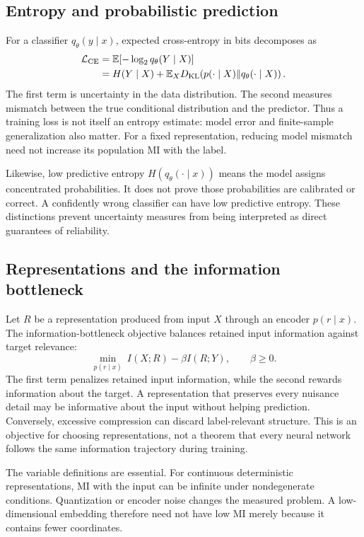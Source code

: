 \documentclass[journal,11pt]{IEEEtran}
\begin{document}
\subsection{Entropy and probabilistic prediction}
For a classifier $q_\theta(y\mid x)$, expected cross-entropy in bits decomposes as
\begin{align}
\mathcal L_{\rm CE}&=\mathbb E[-\log_2 q_\theta(Y\mid X)]\\
&=H(Y\mid X)+\mathbb E_X D_{\rm KL}\!\left(p(\cdot\mid X)\|q_\theta(\cdot\mid X)\right).
\end{align}
The first term is uncertainty in the data distribution. The second measures mismatch between the true conditional distribution and the predictor. Thus a training loss is not itself an entropy estimate: model error and finite-sample generalization also matter. For a fixed representation, reducing model mismatch need not increase its population MI with the label.

Likewise, low predictive entropy $H(q_\theta(\cdot\mid x))$ means the model assigns concentrated probabilities. It does not prove those probabilities are calibrated or correct. A confidently wrong classifier can have low predictive entropy. These distinctions prevent uncertainty measures from being interpreted as direct guarantees of reliability.

\subsection{Representations and the information bottleneck}
Let $R$ be a representation produced from input $X$ through an encoder $p(r\mid x)$. The information-bottleneck objective \cite{ib} balances retained input information against target relevance:
\begin{equation}
\min_{p(r\mid x)}\ I(X;R)-\beta I(R;Y),\qquad \beta\geq0.
\end{equation}
The first term penalizes retained input information, while the second rewards information about the target. A representation that preserves every nuisance detail may be informative about the input without helping prediction. Conversely, excessive compression can discard label-relevant structure. This is an objective for choosing representations, not a theorem that every neural network follows the same information trajectory during training.

The variable definitions are essential. For continuous deterministic representations, MI with the input can be infinite under nondegenerate conditions. Quantization or encoder noise changes the measured problem. A low-dimensional embedding therefore need not have low MI merely because it contains fewer coordinates.
\end{document}
